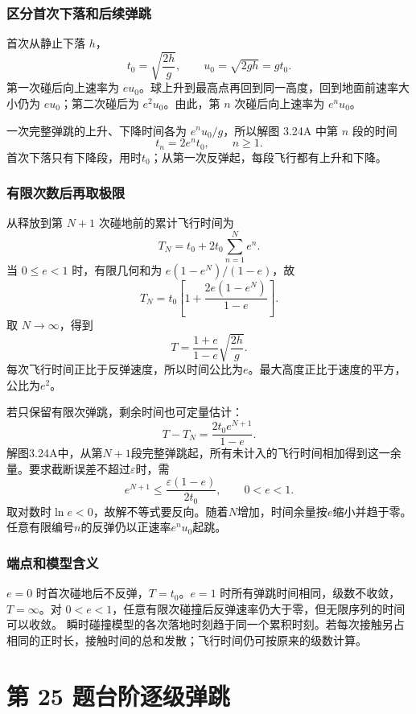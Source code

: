 \documentclass[UTF8,fontset=fandol,a4paper,11pt]{ctexart}
\newcommand{\tagline}[1]{\noindent{\small\color{muted}#1}\par}
\begin{document}
\subsubsection*{区分首次下落和后续弹跳}
首次从静止下落 $h$，
\[
t_0=\sqrt{\frac{2h}{g}},\qquad u_0=\sqrt{2gh}=gt_0.
\]
第一次碰后向上速率为 $eu_0$。球上升到最高点再回到同一高度，回到地面前速率大小仍为 $eu_0$；第二次碰后为 $e^2u_0$。由此，第 $n$ 次碰后向上速率为 $e^nu_0$。

一次完整弹跳的上升、下降时间各为 $e^nu_0/g$，所以解图 3.24A 中第 $n$ 段的时间
\[
t_n=2e^nt_0,\qquad n\geq1.
\]
首次下落只有下降段，用时$t_0$；从第一次反弹起，每段飞行都有上升和下降。

\subsubsection*{有限次数后再取极限}
从释放到第 $N+1$ 次碰地前的累计飞行时间为
\[
T_N=t_0+2t_0\sum_{n=1}^{N}e^n.
\]
当 $0\leq e<1$ 时，有限几何和为 $e(1-e^N)/(1-e)$，故
\[
T_N=t_0\left[1+\frac{2e(1-e^N)}{1-e}\right].
\]
取 $N\to\infty$，得到
\[
\boxed{T=\frac{1+e}{1-e}\sqrt{\frac{2h}{g}}}.
\]
每次飞行时间正比于反弹速度，所以时间公比为$e$。最大高度正比于速度的平方，公比为$e^2$。

若只保留有限次弹跳，剩余时间也可定量估计：
\[T-T_N=\frac{2t_0e^{N+1}}{1-e}.\]
解图3.24A中，从第$N+1$段完整弹跳起，所有未计入的飞行时间相加得到这一余量。要求截断误差不超过$\varepsilon$时，需
\[e^{N+1}\le\frac{\varepsilon(1-e)}{2t_0},\qquad0<e<1.\]
取对数时$\ln e<0$，故解不等式要反向。随着$N$增加，时间余量按$e$缩小并趋于零。任意有限编号$n$的反弹仍以正速率$e^nu_0$起跳。

\subsubsection*{端点和模型含义}
$e=0$ 时首次碰地后不反弹，$T=t_0$。$e=1$ 时所有弹跳时间相同，级数不收敛，$T=\infty$。对 $0<e<1$，任意有限次碰撞后反弹速率仍大于零，但无限序列的时间可以收敛。
瞬时碰撞模型的各次落地时刻趋于同一个累积时刻。若每次接触另占相同的正时长，接触时间的总和发散；飞行时间仍可按原来的级数计算。



\section*{第 25 题\quad 台阶逐级弹跳}

\tagline{M-03-25}
\end{document}
